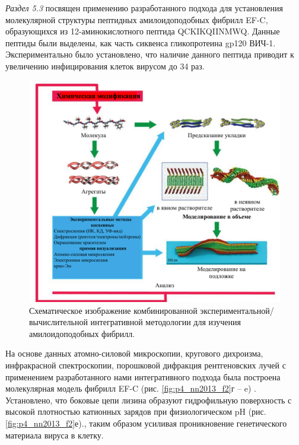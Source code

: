\textit{Раздел 5.3} посвящен применению разработанного подхода для установления молекулярной структуры пептидных амилоидоподобных фибрилл EF-C, образующихся из 12-аминокислотного пептида QCKIKQIINMWQ. Данные пептиды были выделены, как часть сиквенса гликопротеина gp120 ВИЧ-1. Экспериментально было установлено, что наличие данного пептида приводит к увеличению инфицирования клеток вирусом до 34 раз.

\begin{figure} [H]
    \centering
    \includegraphics[width=\textwidth]{images/p4/punkt5/part4_p5_f54.pdf}
    \caption[Схематическое изображение комбинированной экспериментальной/вычислительной интегративной методологии для изучения амилоидоподобных фибрилл]{Схематическое изображение комбинированной экспериментальной/вычислительной интегративной методологии для изучения амилоидоподобных фибрилл.}
    \label{fig:p4_p5_f54}
\end{figure}


 На основе данных атомно-силовой микроскопии, кругового дихроизма, инфракрасной спектроскопии, порошковой дифракция рентгеновских лучей с применением разработанного нами интегративного подхода была построена молекулярная модель фибрилл EF-C (рис. \ref{fig:p4_nn2013_f2}г – e) \cite{yolamanova_peptide_2013}. Установлено, что боковые цепи лизина образуют гидрофильную поверхность с высокой плотностью катионных зарядов при физиологическом pH (рис. \ref{fig:p4_nn2013_f2}е)., таким образом усиливая проникновение генетического материала вируса в клетку.
    
